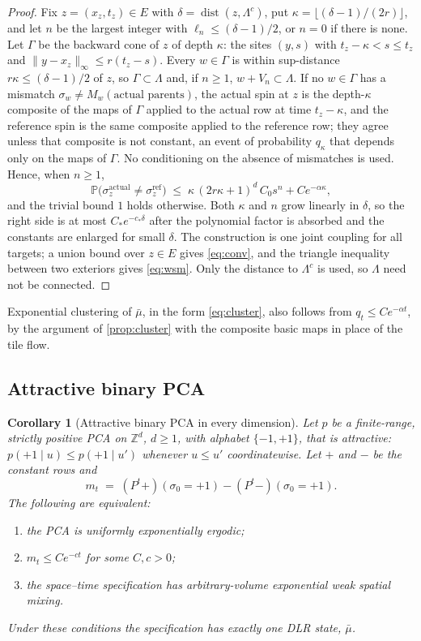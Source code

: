 \documentclass[11pt]{article}
\theoremstyle{plain}
\newtheorem{corollary}[theorem]{Corollary}
\theoremstyle{definition}
\theoremstyle{remark}
\newcommand{\Z}{\mathbb{Z}}
\newcommand{\Prob}{\mathbb{P}}
\newcommand{\Lam}{\Lambda}
\newcommand{\ba}{\bar{\mu}}
\newcommand{\dist}{\operatorname{dist}}
\begin{document}
\begin{proof}
Fix $z=(x_z,t_z)\in E$ with $\delta=\dist(z,\Lam^c)$, put $\kappa=\lfloor(\delta-1)/(2r)\rfloor$, and let $n$ be the largest integer with $\ell_n\le(\delta-1)/2$, or $n=0$ if there is none. Let $\Gamma$ be the backward cone of $z$ of depth $\kappa$: the sites $(y,s)$ with $t_z-\kappa<s\le t_z$ and $\|y-x_z\|_\infty\le r(t_z-s)$. Every $w\in\Gamma$ is within sup-distance $r\kappa\le(\delta-1)/2$ of $z$, so $\Gamma\subset\Lam$ and, if $n\ge1$, $w+V_n\subset\Lam$. If no $w\in\Gamma$ has a mismatch $\sigma_w\neq M_w(\text{actual parents})$, the actual spin at $z$ is the depth-$\kappa$ composite of the maps of $\Gamma$ applied to the actual row at time $t_z-\kappa$, and the reference spin is the same composite applied to the reference row; they agree unless that composite is not constant, an event of probability $q_\kappa$ that depends only on the maps of $\Gamma$. No conditioning on the absence of mismatches is used. Hence, when $n\ge1$,
\[
\Prob\bigl(\sigma^{\mathrm{actual}}_z\neq\sigma^{\mathrm{ref}}_z\bigr)\;\le\;\kappa\,(2r\kappa+1)^d\,C_0s^{n}+Ce^{-\alpha\kappa},
\]
and the trivial bound $1$ holds otherwise. Both $\kappa$ and $n$ grow linearly in $\delta$, so the right side is at most $C_*e^{-c_*\delta}$ after the polynomial factor is absorbed and the constants are enlarged for small $\delta$. The construction is one joint coupling for all targets; a union bound over $z\in E$ gives \eqref{eq:conv}, and the triangle inequality between two exteriors gives \eqref{eq:wsm}. Only the distance to $\Lam^c$ is used, so $\Lam$ need not be connected.
\end{proof}

Exponential clustering of $\ba$, in the form \eqref{eq:cluster}, also follows from $q_t\le Ce^{-\alpha t}$, by the argument of \cref{prop:cluster} with the composite basic maps in place of the tile flow.

\subsection{Attractive binary PCA}

\begin{corollary}[Attractive binary PCA in every dimension]
\label{cor:attractive}
Let $p$ be a finite-range, strictly positive PCA on $\Z^d$, $d\ge1$, with alphabet $\{-1,+1\}$, that is \emph{attractive}: $p(+1\mid u)\le p(+1\mid u')$ whenever $u\le u'$ coordinatewise. Let $\mathbf+$ and $\mathbf-$ be the constant rows and
\[
m_t\;=\;(P^t\mathbf+)(\sigma_0=+1)-(P^t\mathbf-)(\sigma_0=+1).
\]
The following are equivalent:
\begin{enumerate}[label=(\alph*)]
\item the PCA is uniformly exponentially ergodic;
\item $m_t\le Ce^{-ct}$ for some $C,c>0$;
\item the space--time specification has arbitrary-volume exponential weak spatial mixing.
\end{enumerate}
Under these conditions the specification has exactly one DLR state, $\ba$.
\end{corollary}
\end{document}
